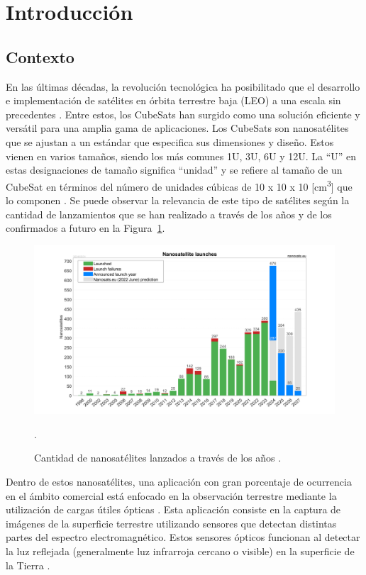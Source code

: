 \section{Introducción}

\subsection{Contexto}
En las últimas décadas, la revolución tecnológica ha posibilitado que el desarrollo e implementación de satélites en órbita terrestre baja (LEO) a una escala sin precedentes \cite{ref1}. Entre estos, los CubeSats han surgido como una solución eficiente y versátil para una amplia gama de aplicaciones. Los CubeSats son nanosatélites que se ajustan a un estándar que especifica sus dimensiones y diseño. Estos vienen en varios tamaños, siendo los más comunes 1U, 3U, 6U y 12U. La “U” en estas designaciones de tamaño significa “unidad” y se refiere al tamaño de un CubeSat en términos del número de unidades cúbicas de 10 x 10 x 10 [cm\textsuperscript{3}] que lo componen \cite{ref2}. Se puede observar la relevancia de este tipo de satélites según la cantidad de lanzamientos que se han realizado a través de los años y de los confirmados a futuro en la Figura~\ref{fig:nanosats}.

\begin{figure}[h]
	\centering    
	\includegraphics[width=1\textwidth]{Nanosats_years_2024-05-31_large.png}
	\caption{Cantidad de nanosatélites lanzados a través de los años \cite{ref1}.}.
	\label{fig:nanosats}
\end{figure}

Dentro de estos nanosatélites, una aplicación con gran porcentaje de ocurrencia en el ámbito comercial está enfocado en la observación terrestre mediante la utilización de cargas útiles ópticas \cite{ref3}. Esta aplicación consiste en la captura de imágenes de la superficie terrestre utilizando sensores que detectan distintas partes del espectro electromagnético. Estos sensores ópticos funcionan al detectar la luz reflejada (generalmente luz infrarroja cercano o visible) en la superficie de la Tierra \cite{ref4}.


